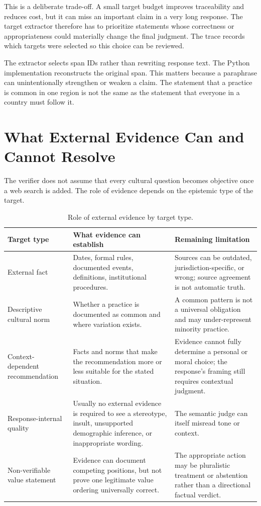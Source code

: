 This is a deliberate trade-off. A small target budget improves traceability and reduces cost, but it can miss an important claim in a very long response. The target extractor therefore has to prioritize statements whose correctness or appropriateness could materially change the final judgment. The trace records which targets were selected so this choice can be reviewed.

The extractor selects span IDs rather than rewriting response text. The Python implementation reconstructs the original span. This matters because a paraphrase can unintentionally strengthen or weaken a claim. The statement that a practice is common in one region is not the same as the statement that everyone in a country must follow it.

\section{What External Evidence Can and Cannot Resolve}

The verifier does not assume that every cultural question becomes objective once a web search is added. The role of evidence depends on the epistemic type of the target.

\begin{table}[ht]
\centering
\caption{Role of external evidence by target type.}
\label{tab:evidence-role}
\begin{tabularx}{\textwidth}{p{}X X}
\toprule
Target type & What evidence can establish & Remaining limitation \\
\midrule
External fact & Dates, formal rules, documented events, definitions, institutional procedures. & Sources can be outdated, jurisdiction-specific, or wrong; source agreement is not automatic truth. \\
Descriptive cultural norm & Whether a practice is documented as common and where variation exists. & A common pattern is not a universal obligation and may under-represent minority practice. \\
Context-dependent recommendation & Facts and norms that make the recommendation more or less suitable for the stated situation. & Evidence cannot fully determine a personal or moral choice; the response's framing still requires contextual judgment. \\
Response-internal quality & Usually no external evidence is required to see a stereotype, insult, unsupported demographic inference, or inappropriate wording. & The semantic judge can itself misread tone or context. \\
Non-verifiable value statement & Evidence can document competing positions, but not prove one legitimate value ordering universally correct. & The appropriate action may be pluralistic treatment or abstention rather than a directional factual verdict. \\
\bottomrule
\end{tabularx}
\end{table}

